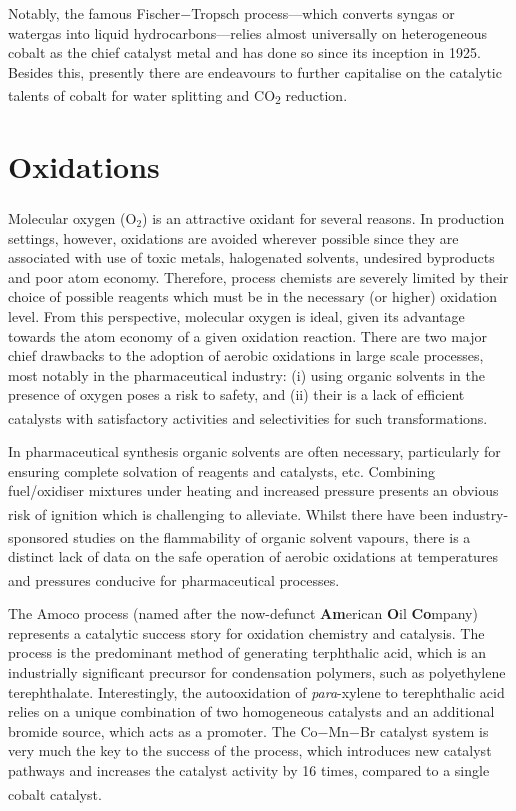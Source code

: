 Notably, the famous Fischer$-$Tropsch process---which converts syngas or watergas into liquid hydrocarbons---relies almost universally on heterogeneous cobalt as the chief catalyst metal and has done so since its inception in 1925. Besides this, presently there are endeavours to further capitalise on the catalytic talents of cobalt for water splitting and CO\textsubscript{2} reduction.\textsuperscript{\cite{wang:2016, gao:2016}}

\section{Oxidations}
  
\noindent Molecular oxygen (O$_2$) is an attractive oxidant for several reasons.\textsuperscript{\cite{gavriilidis:2016}} In production settings, however, oxidations are avoided wherever possible since they are associated with use of toxic metals, halogenated solvents, undesired byproducts and poor atom economy. Therefore, process chemists are severely limited by their choice of possible reagents which must be in the necessary (or higher) oxidation level. From this perspective, molecular oxygen is ideal, given its advantage towards the atom economy of a given oxidation reaction. There are two major chief drawbacks to the adoption of aerobic oxidations in large scale processes, most notably in the pharmaceutical industry: (i) using organic solvents in the presence of oxygen poses a risk to safety, and (ii) their is a lack of efficient catalysts with satisfactory activities and selectivities for such transformations.\textsuperscript{\cite{osterberg:2014}}

In pharmaceutical synthesis organic solvents are often necessary, particularly for ensuring complete solvation of reagents and catalysts, etc. Combining fuel/oxidiser mixtures under heating and increased pressure presents an obvious risk of ignition which is challenging to alleviate.\textsuperscript{\cite{lewis:1987}} Whilst there have been industry-sponsored studies on the flammability of organic solvent vapours,\textsuperscript{\cite{brooks:2007, zabetakis:1965}} there is a distinct lack of data on the safe operation of aerobic oxidations at temperatures and pressures conducive for pharmaceutical processes.\textsuperscript{\cite{osterberg:2014}}

The Amoco process (named after the now-defunct \textbf{Am}erican \textbf{O}il \textbf{Co}mpany) represents a catalytic success story for oxidation chemistry and catalysis. The process is the predominant method of generating terphthalic acid, which is an industrially significant precursor for condensation polymers, such as polyethylene terephthalate. Interestingly, the autooxidation of \textit{para}-xylene to terephthalic acid relies on a unique combination of two homogeneous catalysts and an additional bromide source, which acts as a promoter. The Co$-$Mn$-$Br catalyst system is very much the key to the success of the process, which introduces new catalyst pathways and increases the catalyst activity by 16 times, compared to a single cobalt catalyst.\textsuperscript{\cite{tomas:2013, brill:1960}}

